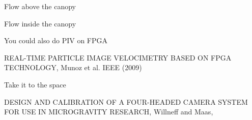     
    
    
    
    
    \begin{frame}[label=app-12]{Flow above the canopy}
    \centering
    \end{frame}
    
    \begin{frame}[label=app-11]{Flow inside the canopy}
    \centering
    \end{frame}
    
    
%    
%    
    \begin{frame}[label=app-110]{You could also do PIV on FPGA}
    \begin{cardTiny}
    REAL-TIME PARTICLE IMAGE VELOCIMETRY
    BASED ON FPGA TECHNOLOGY, Munoz et al. IEEE (2009)
    \end{cardTiny}
    \end{frame}
%    
%    
    \begin{frame}[label=app-111]{Take it to the space}
    \begin{cardTiny}
    DESIGN AND CALIBRATION OF A FOUR-HEADED CAMERA SYSTEM
    FOR USE IN MICROGRAVITY RESEARCH, Willneff and Maas, 
    \end{cardTiny}
    \end{frame}
    

